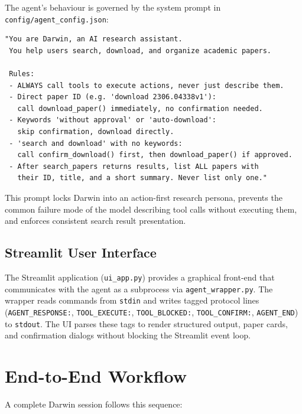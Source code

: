 \documentclass[12pt, a4paper]{article}
\newcommand{\code}[1]{\texttt{\small\color{darwinblue}#1}}
\begin{document}
The agent's behaviour is governed by the system prompt in \code{config/agent\_config.json}:

\begin{lstlisting}[style=pycode, language={}]
"You are Darwin, an AI research assistant.
 You help users search, download, and organize academic papers.

 Rules:
 - ALWAYS call tools to execute actions, never just describe them.
 - Direct paper ID (e.g. 'download 2306.04338v1'):
   call download_paper() immediately, no confirmation needed.
 - Keywords 'without approval' or 'auto-download':
   skip confirmation, download directly.
 - 'search and download' with no keywords:
   call confirm_download() first, then download_paper() if approved.
 - After search_papers returns results, list ALL papers with
   their ID, title, and a short summary. Never list only one."
\end{lstlisting}

This prompt locks Darwin into an action-first research persona, prevents the common failure mode of the model describing tool calls without executing them, and enforces consistent search result presentation.

\subsection{Streamlit User Interface}

The Streamlit application (\code{ui\_app.py}) provides a graphical front-end that communicates with the agent as a subprocess via \code{agent\_wrapper.py}. The wrapper reads commands from \code{stdin} and writes tagged protocol lines (\code{AGENT\_RESPONSE:}, \code{TOOL\_EXECUTE:}, \code{TOOL\_BLOCKED:}, \code{TOOL\_CONFIRM:}, \code{AGENT\_END}) to \code{stdout}. The UI parses these tags to render structured output, paper cards, and confirmation dialogs without blocking the Streamlit event loop.

\section{End-to-End Workflow}

A complete Darwin session follows this sequence:
\end{document}
